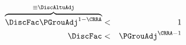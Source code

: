 \begin{eqnarray}
\overbrace{\DiscFac \PGrouAdj^{1-\CRRA} }^{\equiv \DiscAltuAdj} & < & 1 \label{eq:FVAC}
\\ \DiscFac & < & \PGrouAdj^{\CRRA-1} \notag
\end{eqnarray}

